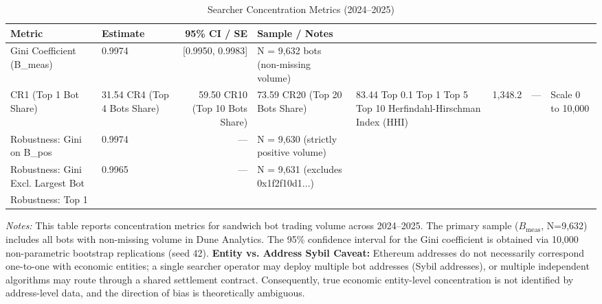 \begin{table}[htbp]
\centering
\caption{Searcher Concentration Metrics (2024--2025)}
\label{tab:concentration}
\begin{tabular}{llrl}
\toprule
Metric & Estimate & 95\% CI / SE & Sample / Notes \\
\midrule
Gini Coefficient (B_meas) & 0.9974 & [0.9950, 0.9983] & N = 9,632 bots (non-missing volume) \\
CR1 (Top 1 Bot Share) & 31.54%
CR4 (Top 4 Bots Share) & 59.50%
CR10 (Top 10 Bots Share) & 73.59%
CR20 (Top 20 Bots Share) & 83.44%
Top 0.1%
Top 1%
Top 5%
Top 10%
Herfindahl-Hirschman Index (HHI) & 1,348.2 & --- & Scale 0 to 10,000 \\
Robustness: Gini on B_pos & 0.9974 & --- & N = 9,630 (strictly positive volume) \\
Robustness: Gini Excl. Largest Bot & 0.9965 & --- & N = 9,631 (excludes 0x1f2f10d1...) \\
Robustness: Top 1%
\bottomrule
\end{tabular}
\vspace{0.2cm}
\begin{minipage}{\linewidth}
\small
\textit{Notes:} This table reports concentration metrics for sandwich bot trading volume across 2024--2025. The primary sample ($B_{\text{meas}}$, N=9,632) includes all bots with non-missing volume in Dune Analytics. The 95\% confidence interval for the Gini coefficient is obtained via 10,000 non-parametric bootstrap replications (seed 42). \textbf{Entity vs. Address Sybil Caveat:} Ethereum addresses do not necessarily correspond one-to-one with economic entities; a single searcher operator may deploy multiple bot addresses (Sybil addresses), or multiple independent algorithms may route through a shared settlement contract. Consequently, true economic entity-level concentration is not identified by address-level data, and the direction of bias is theoretically ambiguous.
\end{minipage}
\end{table}
